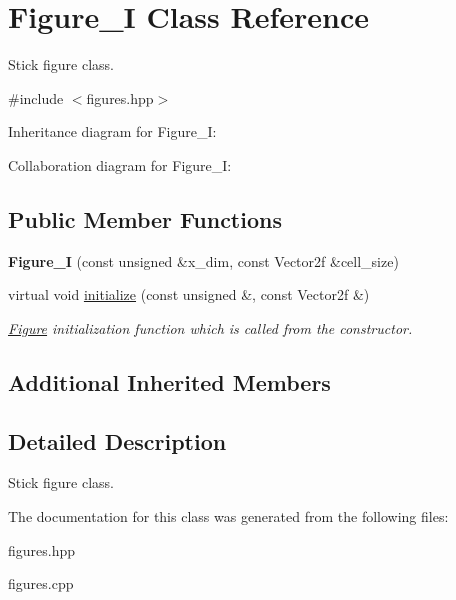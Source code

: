 \hypertarget{classFigure__I}{}\section{Figure\+\_\+I Class Reference}
\label{classFigure__I}


Stick figure class.  




{\ttfamily \#include $<$figures.\+hpp$>$}



Inheritance diagram for Figure\+\_\+I\+:


Collaboration diagram for Figure\+\_\+I\+:
\subsection*{Public Member Functions}
\begin{DoxyCompactItemize}
\item 
\mbox{\label{classFigure__I_a6c0bef49078bc9f277072204f61fce61}} 
{\bfseries Figure\+\_\+I} (const unsigned \&x\+\_\+dim, const Vector2f \&cell\+\_\+size)
\item 
\mbox{\label{classFigure__I_a16de1706815d6eef23b415f59d6ea1c2}} 
virtual void \hyperlink{classFigure__I_a16de1706815d6eef23b415f59d6ea1c2}{initialize} (const unsigned \&, const Vector2f \&)
\begin{DoxyCompactList}\small\item\em \hyperlink{classFigure}{Figure} initialization function which is called from the constructor. \end{DoxyCompactList}\end{DoxyCompactItemize}
\subsection*{Additional Inherited Members}


\subsection{Detailed Description}
Stick figure class. 

The documentation for this class was generated from the following files\+:\begin{DoxyCompactItemize}
\item 
figures.\+hpp\item 
figures.\+cpp\end{DoxyCompactItemize}
